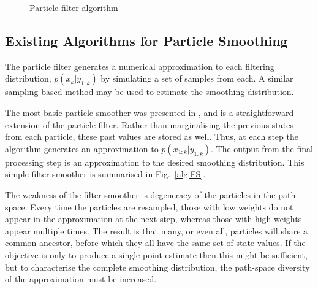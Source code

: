 \documentclass[10pt,twocolumn,twoside]{IEEEtran}
\begin{document}
\begin{figure}
\caption{Particle filter algorithm}
\label{alg:PF}
\end{figure}

\subsection{Existing Algorithms for Particle Smoothing } \label{sec:existing_smoothers}

The particle filter generates a numerical approximation to each filtering distribution, $p(x_k|y_{1:k})$ by simulating a set of samples from each. A similar sampling-based method may be used to estimate the smoothing distribution.

The most basic particle smoother was presented in \cite{Kitagawa1996}, and is a straightforward extension of the particle filter. Rather than marginalising the previous states from each particle, these past values are stored as well. Thus, at each step the algorithm generates an approximation to $p(x_{1:k}|y_{1:k})$. The output from the final processing step is an approximation to the desired smoothing distribution. This simple filter-smoother is summarised in Fig.~\ref{alg:FS}.

The weakness of the filter-smoother is degeneracy of the particles in the path-space. Every time the particles are resampled, those with low weights do not appear in the approximation at the next step, whereas those with high weights appear multiple times. The result is that many, or even all, particles will share a common ancestor, before which they all have the same set of state values. If the objective is only to produce a single point estimate then this might be sufficient, but to characterise the complete smoothing distribution, the path-space diversity of the approximation must be increased.
\end{document}
